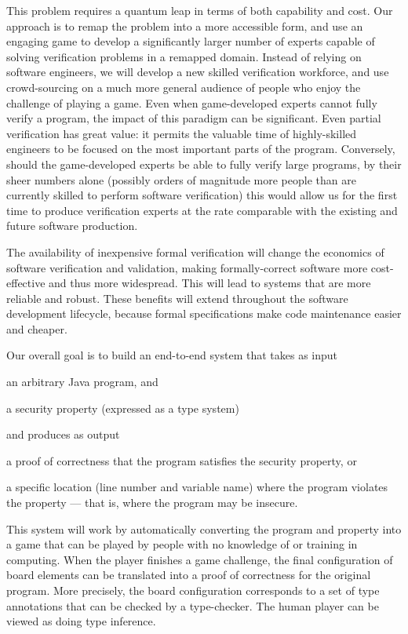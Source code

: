 \documentclass{sig-alternate}
\let\Itemize =\itemize
\def\Nospacing{\itemsep=0pt\topsep=0pt\partopsep=0pt\parskip=0pt\parsep=0pt}
\renewenvironment{itemize}{\Itemize\Nospacing}{\endlist}
\begin{document}
This problem requires a quantum leap in terms of both capability and
cost.  Our approach is to remap the problem into a more accessible
form, and use an engaging game to develop a significantly larger
number of experts capable of solving verification problems in a
remapped domain.  Instead of relying on software engineers, we will
develop a new skilled verification workforce, and use crowd-sourcing
on a much more general audience of people who enjoy the challenge of
playing a game.  Even when game-developed experts cannot fully verify
a program, the impact of this paradigm can be significant.  Even
partial verification has great value: it permits the valuable time of
highly-skilled engineers to be focused on the most important parts of
the program.  Conversely, should the game-developed experts be able to
fully verify large programs, by their sheer numbers alone (possibly
orders of magnitude more people than are currently skilled to perform
software verification) this would allow us for the first time to
produce verification experts at the rate comparable with the existing
and future software production.

The availability of inexpensive formal verification will change the
economics of software verification and validation, making
formally-correct software more cost-effective and thus more
widespread.  This will lead to systems that are more reliable and
robust.  These benefits will extend throughout the software
development lifecycle, because formal specifications make code
maintenance easier and cheaper.

Our overall goal is to build an end-to-end system that takes as input

\begin{itemize}
\item
 an arbitrary Java program, and
\item
 a security property (expressed as a type system)
\end{itemize}

\noindent
and produces as output

\begin{itemize}
\item
 a proof of correctness that the program satisfies the security property,
 or
\item
 a specific location (line number and variable name) where the program
 violates the property --- that is, where the program may be insecure.
\end{itemize}

This system will work by automatically converting the program and
property into a game that can be played by people with no knowledge of
or training in computing.  When the player finishes a game challenge,
the final configuration of board elements can be translated into a
proof of correctness for the original program.  More precisely, the
board configuration corresponds to a set of type annotations that can
be checked by a type-checker.  The human player can be viewed as doing
type inference.
\end{document}
